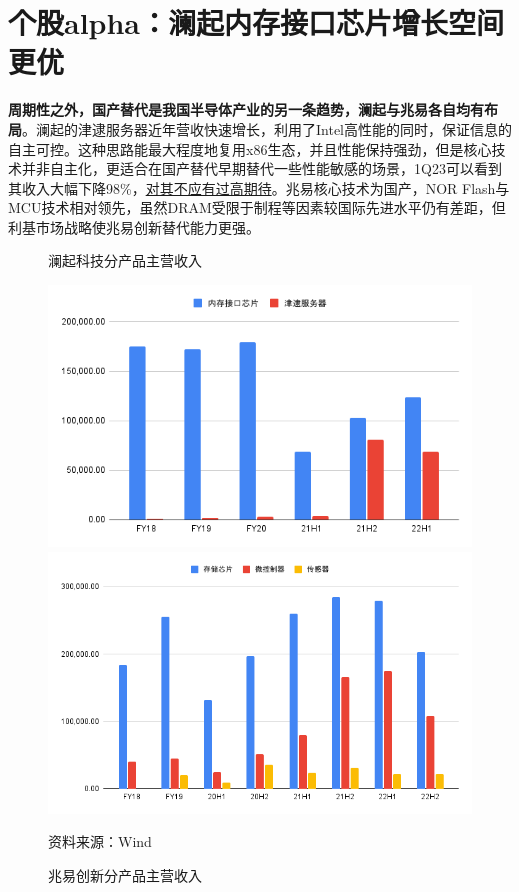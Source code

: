 \documentclass[a4paper,12pt]{ctexart}
\begin{document}
\section{个股alpha：澜起内存接口芯片增长空间更优}
\textbf{周期性之外，国产替代是我国半导体产业的另一条趋势，澜起与兆易各自均有布局}。澜起的津逮服务器近年营收快速增长，利用了Intel高性能的同时，保证信息的自主可控。这种思路能最大程度地复用x86生态，并且性能保持强劲，但是核心技术并非自主化，更适合在国产替代早期替代一些性能敏感的场景，1Q23可以看到其收入大幅下降98\%，\uline{对其不应有过高期待}。兆易核心技术为国产，NOR Flash与MCU技术相对领先，虽然DRAM受限于制程等因素较国际先进水平仍有差距，但利基市场战略使兆易创新替代能力更强。
\begin{figure}[H]
    \begin{minipage}{0.48\linewidth}
        \caption{澜起科技分产品主营收入}
        \centering
        \includegraphics[width=\linewidth]{img/lqkj-rev.png}
    \end{minipage}
    \begin{minipage}{0.48\linewidth}
        \caption{兆易创新分产品主营收入}
        \centering
        \includegraphics[width=\linewidth]{img/zycx-rev.png}
    \end{minipage}\par
    \footnotesize{资料来源：Wind}
\end{figure}
\end{document}
